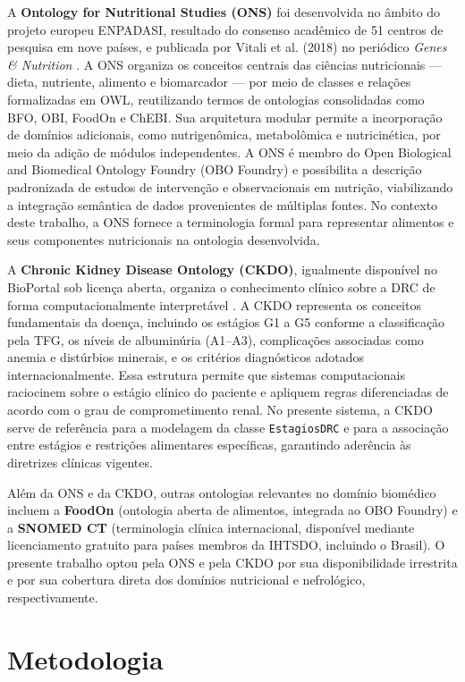 \documentclass[12pt, a4paper, twocolumn]{article}
\begin{document}
A \textbf{Ontology for Nutritional Studies (ONS)} foi desenvolvida no âmbito do projeto europeu ENPADASI, resultado do consenso acadêmico de 51 centros de pesquisa em nove países, e publicada por Vitali et al. (2018) no periódico \textit{Genes \& Nutrition} \cite{ons}. A ONS organiza os conceitos centrais das ciências nutricionais --- dieta, nutriente, alimento e biomarcador --- por meio de classes e relações formalizadas em OWL, reutilizando termos de ontologias consolidadas como BFO, OBI, FoodOn e ChEBI. Sua arquitetura modular permite a incorporação de domínios adicionais, como nutrigenômica, metabolômica e nutricinética, por meio da adição de módulos independentes. A ONS é membro do Open Biological and Biomedical Ontology Foundry (OBO Foundry) e possibilita a descrição padronizada de estudos de intervenção e observacionais em nutrição, viabilizando a integração semântica de dados provenientes de múltiplas fontes. No contexto deste trabalho, a ONS fornece a terminologia formal para representar alimentos e seus componentes nutricionais na ontologia desenvolvida.

A \textbf{Chronic Kidney Disease Ontology (CKDO)}, igualmente disponível no BioPortal sob licença aberta, organiza o conhecimento clínico sobre a DRC de forma computacionalmente interpretável \cite{ckdo}. A CKDO representa os conceitos fundamentais da doença, incluindo os estágios G1 a G5 conforme a classificação pela TFG, os níveis de albuminúria (A1--A3), complicações associadas como anemia e distúrbios minerais, e os critérios diagnósticos adotados internacionalmente. Essa estrutura permite que sistemas computacionais raciocinem sobre o estágio clínico do paciente e apliquem regras diferenciadas de acordo com o grau de comprometimento renal. No presente sistema, a CKDO serve de referência para a modelagem da classe \texttt{EstagiosDRC} e para a associação entre estágios e restrições alimentares específicas, garantindo aderência às diretrizes clínicas vigentes.

Além da ONS e da CKDO, outras ontologias relevantes no domínio biomédico incluem a \textbf{FoodOn} (ontologia aberta de alimentos, integrada ao OBO Foundry) e a \textbf{SNOMED CT} (terminologia clínica internacional, disponível mediante licenciamento gratuito para países membros da IHTSDO, incluindo o Brasil). O presente trabalho optou pela ONS e pela CKDO por sua disponibilidade irrestrita e por sua cobertura direta dos domínios nutricional e nefrológico, respectivamente.

\section{Metodologia}
\end{document}

